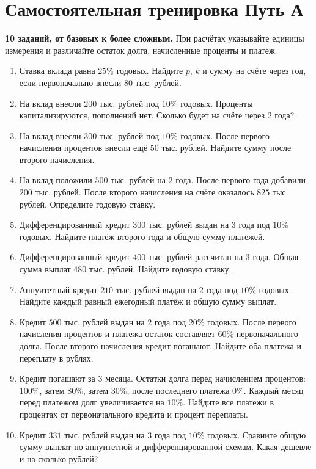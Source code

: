 \documentclass[a4paper,12pt]{article}
\begin{document}
\section*{Самостоятельная тренировка \textemdash{} Путь А}
\textbf{10 заданий, от базовых к более сложным.}
При расчётах указывайте единицы измерения и различайте остаток долга,
начисленные проценты и платёж.
\begin{enumerate}[label=\textbf{\arabic*.},itemsep=9pt]
\item Ставка вклада равна \(25\%\) годовых. Найдите \(p\), \(k\) и сумму на счёте через год, если первоначально внесли \(80\) тыс. рублей.
\item На вклад внесли \(200\) тыс. рублей под \(10\%\) годовых. Проценты капитализируются, пополнений нет. Сколько будет на счёте через \(2\) года?
\item На вклад внесли \(300\) тыс. рублей под \(10\%\) годовых. После первого начисления процентов внесли ещё \(50\) тыс. рублей. Найдите сумму после второго начисления.
\item На вклад положили \(500\) тыс. рублей на \(2\) года. После первого года добавили \(200\) тыс. рублей. После второго начисления на счёте оказалось \(825\) тыс. рублей. Определите годовую ставку.
\item Дифференцированный кредит \(300\) тыс. рублей выдан на \(3\) года под \(10\%\) годовых. Найдите платёж второго года и общую сумму платежей.
\item Дифференцированный кредит \(400\) тыс. рублей рассчитан на \(3\) года. Общая сумма выплат \(480\) тыс. рублей. Найдите годовую ставку.
\item Аннуитетный кредит \(210\) тыс. рублей выдан на \(2\) года под \(10\%\) годовых. Найдите каждый равный ежегодный платёж и общую сумму выплат.
\item Кредит \(500\) тыс. рублей выдан на \(2\) года под \(20\%\) годовых. После первого начисления процентов и платежа остаток составляет \(60\%\) первоначального долга. После второго начисления кредит погашают. Найдите оба платежа и переплату в рублях.
\item Кредит погашают за \(3\) месяца. Остатки долга перед начислением процентов: \(100\%\), затем \(80\%\), затем \(30\%\), после последнего платежа \(0\%\). Каждый месяц перед платежом долг увеличивается на \(10\%\). Найдите все платежи в процентах от первоначального кредита и процент переплаты.
\item Кредит \(331\) тыс. рублей выдан на \(3\) года под \(10\%\) годовых. Сравните общую сумму выплат по аннуитетной и дифференцированной схемам. Какая дешевле и на сколько рублей?
\end{enumerate}
\clearpage
\end{document}
